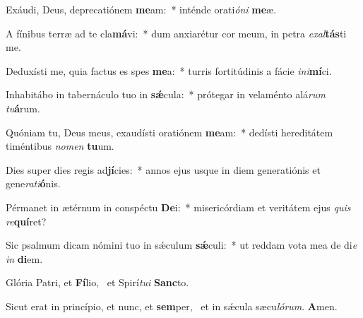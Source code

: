 \item Exáudi, Deus, deprecatiónem \textbf{me}am:~* inténde orati\textit{ó}\textit{ni} \textbf{me}æ.
\item A fínibus terræ ad te cla\textbf{má}vi:~* dum anxiarétur cor meum, in petra \textit{ex}\textit{al}\textbf{tás}ti me.
\item Deduxísti me, quia factus es spes \textbf{me}a:~* turris fortitúdinis a fácie \textit{in}\textit{i}\textbf{mí}ci.
\item Inhabitábo in tabernáculo tuo in \textbf{sǽ}cula:~* prótegar in velaménto alá\textit{rum} \textit{tu}\textbf{á}rum.
\item Quóniam tu, Deus meus, exaudísti oratiónem \textbf{me}am:~* dedísti hereditátem timéntibus \textit{no}\textit{men} \textbf{tu}um.
\item Dies super dies regis ad\textbf{jí}cies:~* annos ejus usque in diem generatiónis et gene\textit{ra}\textit{ti}\textbf{ó}nis.
\item Pérmanet in ætérnum in conspéctu \textbf{De}i:~* misericórdiam et veritátem ejus \textit{quis} \textit{re}\textbf{quí}ret?
\item Sic psalmum dicam nómini tuo in sǽculum \textbf{sǽ}culi:~* ut reddam vota mea de di\textit{e} \textit{in} \textbf{di}em.
\item Glória Patri, et \textbf{Fí}lio,~\psstar{} et Spirí\textit{tu}\textit{i} \textbf{Sanc}to.
\item Sicut erat in princípio, et nunc, et \textbf{sem}per,~\psstar{} et in sǽcula sæcu\textit{ló}\textit{rum}. \textbf{A}men.
